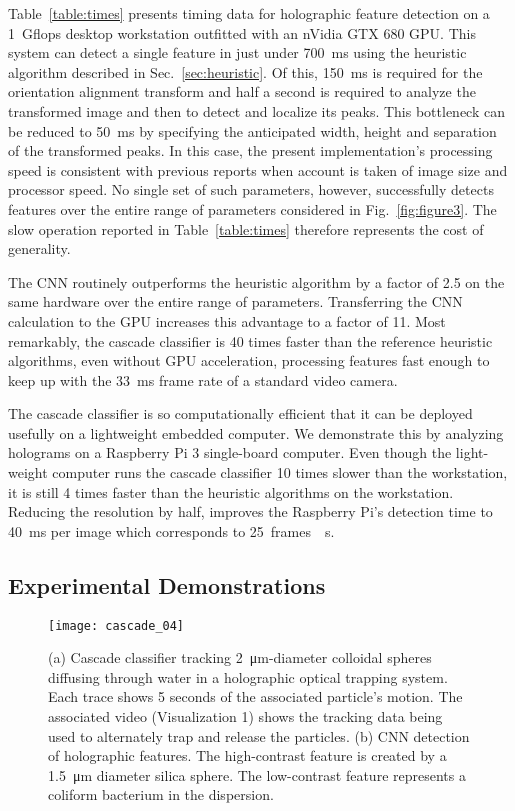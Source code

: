 Table~\ref{table:times} presents timing data for holographic
feature detection on a \SI{1}{Gflops} desktop workstation
outfitted with an
nVidia GTX 680 GPU.
This system can detect a single feature in just under
\SI{700}{\ms} using the heuristic
algorithm described in Sec.~\ref{sec:heuristic}.
Of this, \SI{150}{\ms} is required for the orientation alignment
transform and half a second is required to analyze the
transformed image and then to detect and localize
its peaks.
This bottleneck can be reduced to \SI{50}{\ms} by specifying
the anticipated width, height and separation of the
transformed peaks.
In this case, the present implementation's processing speed
is consistent with previous reports \cite{lee07a,cheong09,allan16trackpy}
when account is taken of image size and processor speed.
No single set of such parameters, however, successfully detects
features over the entire range of parameters considered in
Fig.~\ref{fig:figure3}.
The slow operation reported in Table~\ref{table:times}
therefore represents the cost of generality.

The CNN routinely
outperforms the heuristic algorithm by
a factor of \num{2.5} on the same hardware over the entire
range of parameters.
Transferring the CNN calculation to the GPU
increases this advantage to a factor of \num{11}.
Most remarkably, the cascade classifier is \num{40} times
faster than the reference heuristic algorithms,
even without GPU acceleration, processing features
fast enough to keep up with the \SI{33}{\ms} frame
rate of a standard video camera.

The cascade classifier is so computationally efficient
that it can be deployed usefully on a lightweight
embedded computer. 
We demonstrate this by analyzing holograms on
a Raspberry Pi 3 single-board computer.
Even though the light-weight computer runs the
cascade classifier \num{10} times slower than the
workstation,  it is still \num{4} times faster than the heuristic 
algorithms on the workstation.
Reducing the resolution by half, improves the 
Raspberry Pi's detection time to \SI{40}{\ms} per image 
which corresponds to \SI{25}{frames \per \second}.

\subsection{Experimental Demonstrations}
\label{sec:experiment}

\begin{figure}[!b]
  \centering
  \texttt{[image: cascade\_04]}
  \caption{(a) Cascade classifier tracking \SI{2}{\um}-diameter
    colloidal spheres diffusing through water in a
    holographic optical trapping system.
    Each trace shows 5 seconds of the associated particle's motion.
    The associated video (Visualization 1) shows the tracking data
    being used to alternately trap and release the particles.
    (b) CNN detection of holographic features.
    The high-contrast feature is created by a \SI{1.5}{\um}
    diameter silica sphere.  The low-contrast feature
    represents a coliform bacterium in the dispersion.\cite{hannel18}}
  \label{fig:autotrap}
\end{figure}

